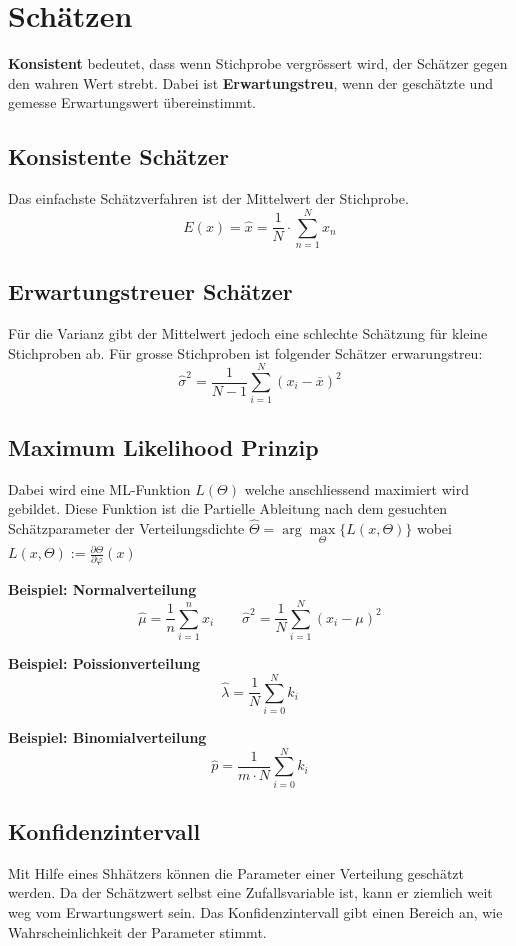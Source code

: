 \section{Schätzen}\label{schaetzen}
\textbf{Konsistent} bedeutet, dass wenn Stichprobe vergrössert wird, der Schätzer gegen den wahren Wert strebt. Dabei ist \textbf{Erwartungstreu}, wenn der geschätzte und gemesse Erwartungswert übereinstimmt.

\subsection{Konsistente Schätzer}
Das einfachste Schätzverfahren ist der Mittelwert der Stichprobe.
\[
E(x) = \hat{x} = \frac{1}{N}\cdot \sum\limits_{n=1}^{N}x_n
\]

\subsection{Erwartungstreuer Schätzer}
Für die Varianz gibt der Mittelwert jedoch eine schlechte Schätzung für kleine Stichproben ab. Für grosse Stichproben ist folgender Schätzer erwarungstreu:
\[
\hat{\sigma}^2 = \frac{1}{N-1}\sum\limits_{i=1}^{N}(x_i - \overline{x})^2
\]

\subsection{Maximum Likelihood Prinzip}
Dabei wird eine ML-Funktion $L(\Theta)$ welche anschliessend maximiert wird gebildet. Diese Funktion ist die Partielle Ableitung nach dem gesuchten Schätzparameter der Verteilungsdichte $\hat{\Theta}  = \arg\max\limits_\Theta\{L(x,\Theta)\}$ wobei $L(x,\Theta) := \frac{\partial\Theta}{\partial\varphi}(x)$

\textbf{Beispiel: Normalverteilung}
\[
\hat{\mu} = \frac{1}{n}\sum\limits_{i=1}^{n}x_i \qquad \hat{\sigma}^2  = \frac{1}{N}\sum\limits_{i=1}^{N}(x_i -\mu)^2
\]

\noindent\textbf{Beispiel: Poissionverteilung} 
\[
\hat{\lambda} = \frac{1}{N}\sum\limits_{i=0}^{N}k_i
\]

\noindent\textbf{Beispiel: Binomialverteilung} 
\[
\hat{p} = \frac{1}{m\cdot N}\sum\limits_{i=0}^{N}k_i
\]


\subsection{Konfidenzintervall}
Mit Hilfe eines Shhätzers können die Parameter einer Verteilung geschätzt werden. Da der Schätzwert selbst eine Zufallsvariable ist, kann er ziemlich weit weg vom Erwartungswert sein. Das Konfidenzintervall gibt einen Bereich an, wie Wahrscheinlichkeit der Parameter stimmt. 


